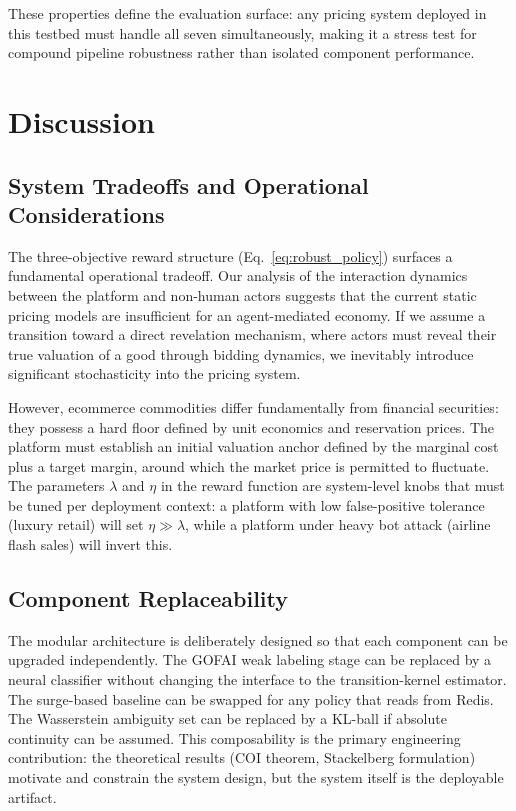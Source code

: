 \documentclass[sigconf]{acmart}
\begin{document}
These properties define the evaluation surface: any pricing system deployed in this testbed must handle all seven simultaneously, making it a stress test for compound pipeline robustness rather than isolated component performance.


\section{Discussion}

\subsection{System Tradeoffs and Operational Considerations}

The three-objective reward structure (Eq.~\ref{eq:robust_policy}) surfaces a fundamental operational tradeoff. Our analysis of the interaction dynamics between the platform and non-human actors suggests that the current static pricing models are insufficient for an agent-mediated economy. If we assume a transition toward a direct revelation mechanism, where actors must reveal their true valuation of a good through bidding dynamics, we inevitably introduce significant stochasticity into the pricing system.

However, ecommerce commodities differ fundamentally from financial securities: they possess a hard floor defined by unit economics and reservation prices. The platform must establish an initial valuation anchor defined by the marginal cost plus a target margin, around which the market price is permitted to fluctuate. The parameters $\lambda$ and $\eta$ in the reward function are system-level knobs that must be tuned per deployment context: a platform with low false-positive tolerance (luxury retail) will set $\eta \gg \lambda$, while a platform under heavy bot attack (airline flash sales) will invert this.

\subsection{Component Replaceability}

The modular architecture is deliberately designed so that each component can be upgraded independently. The GOFAI weak labeling stage can be replaced by a neural classifier without changing the interface to the transition-kernel estimator. The surge-based baseline can be swapped for any policy that reads from Redis. The Wasserstein ambiguity set can be replaced by a KL-ball if absolute continuity can be assumed. This composability is the primary engineering contribution: the theoretical results (COI theorem, Stackelberg formulation) motivate and constrain the system design, but the system itself is the deployable artifact.
\end{document}
